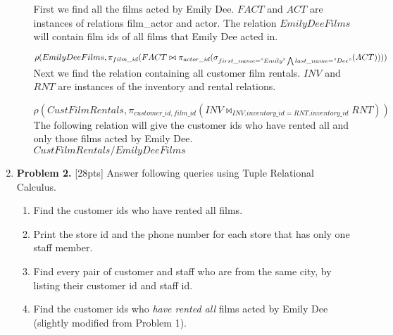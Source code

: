 \documentclass[paper=a4, fontsize=11pt]{scrartcl} %
\numberwithin{figure}{section} %
\numberwithin{table}{section} %
\begin{document}
\begin{enumerate}
\begin{enumerate}
First we find all the films acted by Emily Dee. $FACT$ and $ACT$ are instances of relations film_actor and actor. The relation $EmilyDeeFilms$ will contain film ids of all films that Emily Dee acted in.

$\rho(EmilyDeeFilms, \pi_{film\_id}(FACT \bowtie \pi_{actor\_id}(\sigma_{first\_name = "Emily" \bigwedge last\_name = "Dee"} (ACT))))$\\

Next we find the relation containing all customer film rentals. $INV$ and $RNT$ are instances of the inventory and rental relations.

$\rho(CustFilmRentals, \pi_{customer\_id, film\_id} (INV \bowtie_{INV.inventory\_id = RNT.inventory\_id} RNT))$\\

The following relation will give the customer ids who have rented all and only those films acted by Emily Dee.\\

$CustFilmRentals / EmilyDeeFilms$
\end{enumerate}

\item \textbf{Problem 2.} [28pts] Answer following queries using Tuple Relational Calculus.

\begin{enumerate}

\item Find the customer ids who have rented all films.

\item Print the store id and the phone number for each store that has only one staff member.

\item Find every pair of customer and staff who are from the same city, by listing their customer id and staff id.

\item Find the customer ids who \textit{have rented all} films acted by Emily Dee (slightly modified from Problem 1).

\end{enumerate}

\end{enumerate}
\end{document}
